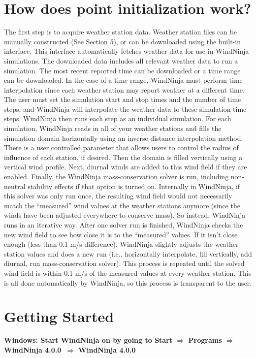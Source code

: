 \documentclass[12pt]{article}
\newcommand\vn{4.0.0}
\begin{document}
\section*{How does point initialization work?}

The first step is to acquire weather station data. 
Weather station files can be manually constructed (See Section 5), or can be downloaded using the built-in interface. 
This interface automatically fetches weather data for use in WindNinja simulations. 
The downloaded data includes all relevant weather data to run a simulation. 
The most recent reported time can be downloaded or a time range can be downloaded.  
In the case of a time range, WindNinja must perform time interpolation since each weather station may report weather at a different time.  
The user must set the simulation start and stop times and the number of time steps, and WindNinja will interpolate the weather data to these simulation time steps.  
WindNinja then runs each step as an individual simulation.
For each simulation, WindNinja reads in all of your weather stations and fills the simulation domain horizontally using an inverse distance interpolation method.  
There is a user controlled parameter that allows users to control the radius of influence of each station, if desired.  
Then the domain is filled vertically using a vertical wind profile.  Next, diurnal winds are added to this wind field if they are enabled.  
Finally, the WindNinja mass-conservation solver is run, including non-neutral stability effects if that option is turned on.  
Internally in WindNinja, if this solver was only run once, the resulting wind field would not necessarily match the “measured” wind values at the weather stations anymore (since the winds have been adjusted everywhere to conserve mass).  
So instead, WindNinja runs in an iterative way.  
After one solver run is finished, WindNinja checks the new wind field to see how close it is to the “measured” values.  
If it isn't close enough (less than 0.1 m/s difference), WindNinja slightly adjusts the weather station values and does a new run (i.e., horizontally interpolate, fill vertically, add diurnal, run mass-conservation solver).  
This process is repeated until the solved wind field is within 0.1 m/s of the measured values at every weather station.  
This is all done automatically by WindNinja, so this process is transparent to the user.  

\section{Getting Started}
\textbf{\color{red}Windows: Start WindNinja on by going to Start $\Rightarrow$ Programs $\Rightarrow$ WindNinja \vn\ $\Rightarrow$ WindNinja \vn\  }
\end{document}
